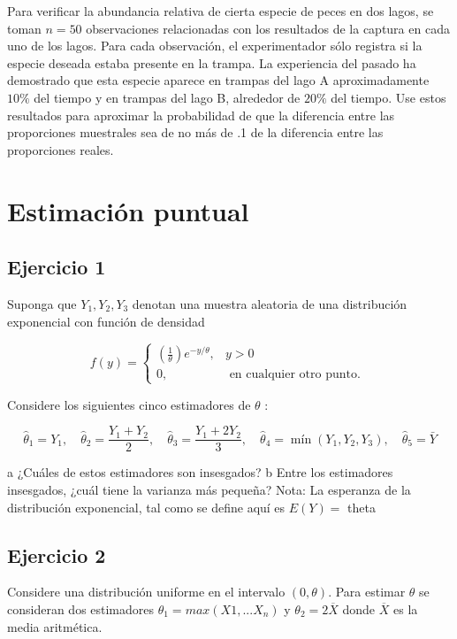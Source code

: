 \documentclass[
]{article}
\begin{document}
Para verificar la abundancia relativa de cierta especie de peces en dos lagos, se toman \(n=50\) observaciones relacionadas con los resultados de la captura en cada uno de los lagos. Para cada observación, el experimentador sólo registra si la especie deseada estaba presente en la trampa. La experiencia del pasado ha demostrado que esta especie aparece en trampas del lago A aproximadamente \(10 \%\) del tiempo y en trampas del lago B, alrededor de \(20 \%\) del tiempo. Use estos resultados para aproximar la probabilidad de que la diferencia entre las proporciones muestrales sea de no más de .1 de la diferencia entre las proporciones reales.

\section{Estimación puntual}\label{estimaciuxf3n-puntual}

\subsection{Ejercicio 1}\label{ejercicio-1-2}

Suponga que \(Y_{1}, Y_{2}, Y_{3}\) denotan una muestra aleatoria de una distribución exponencial con función de densidad

\[
f(y)= \begin{cases}\left(\frac{1}{\theta}\right) e^{-y / \theta}, & y>0 \\ 0, & \text { en cualquier otro punto. }\end{cases}
\]

Considere los siguientes cinco estimadores de \(\theta\) :

\[
\hat{\theta}_{1}=Y_{1}, \quad \hat{\theta}_{2}=\frac{Y_{1}+Y_{2}}{2}, \quad \hat{\theta}_{3}=\frac{Y_{1}+2 Y_{2}}{3}, \quad \hat{\theta}_{4}=\operatorname{mín}\left(Y_{1}, Y_{2}, Y_{3}\right), \quad \hat{\theta}_{5}=\bar{Y}
\]

a ¿Cuáles de estos estimadores son insesgados?
b Entre los estimadores insesgados, ¿cuál tiene la varianza más pequeña?
Nota: La esperanza de la distribución exponencial, tal como se define aquí es \(E(Y)=\) theta

\subsection{Ejercicio 2}\label{ejercicio-2-2}

Considere una distribución uniforme en el intervalo \((0, \theta)\). Para estimar \(\theta\) se consideran dos estimadores \(\theta_1 = max(X1,...X_n)\) y \(\theta_2 = 2 \overline{X}\) donde \(\overline{X}\) es la media aritmética.
\end{document}
